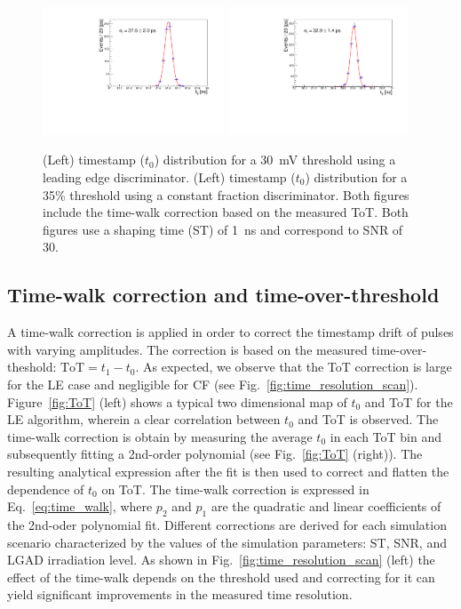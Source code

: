 \documentclass[preprint,1p]{elsarticle}
\begin{document}
  \begin{figure}[htbp]
    \centering
    \includegraphics[width=0.48\textwidth]{figs/pre_rad_st_1ns_snr_30_le_tot_threshold_30mV.pdf} \hfill
    \includegraphics[width=0.48\textwidth]{figs/pre_rad_st_1ns_snr_30_cfd_tot_threshold_35_percent_v2.pdf}
    \caption{(Left) timestamp ($t_{0}$) distribution for a 30~\si{mV} threshold using a leading edge discriminator.
    (Left) timestamp ($t_{0}$) distribution for a 35\% threshold using a constant fraction discriminator. Both figures
    include the time-walk correction based on the measured ToT.
    Both figures use a shaping time (ST) of 1~\si{ns} and correspond to SNR of 30.}
    \label{fig:time_res}
  \end{figure}


\subsection{Time-walk correction and time-over-threshold}\label{sec:tw_and_tot}
A time-walk correction is applied in order to correct the timestamp drift of pulses with varying amplitudes.
The correction is based on the measured time-over-theshold: $\mathrm{ToT} = t_{1} - t_{0}$. As expected, we observe that the ToT correction
is large for the LE case and negligible for CF (see Fig.~\ref{fig:time_resolution_scan}).
Figure~\ref{fig:ToT} (left) shows a typical two dimensional map of $t_{0}$ and ToT for the
LE algorithm, wherein a clear correlation between $t_{0}$ and ToT is observed. The time-walk correction is obtain by measuring the average
$t_{0}$ in each ToT bin and subsequently fitting a 2nd-order polynomial (see Fig.~\ref{fig:ToT} (right)).
The resulting analytical expression after the fit is then used to correct and flatten the dependence of $t_{0}$ on ToT.
The time-walk correction is expressed in Eq.~\ref{eq:time_walk}, where $p_{2}$ and $p_{1}$ are the quadratic
and linear coefficients of the 2nd-oder polynomial fit. Different corrections are derived for each simulation scenario
characterized by the values of the simulation parameters: ST, SNR, and LGAD irradiation level.
As shown in Fig.~\ref{fig:time_resolution_scan} (left) the effect of the time-walk depends on the threshold used and correcting for it
can yield significant improvements in the measured time resolution.
\end{document}
